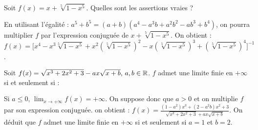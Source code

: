 \begin{question}

Soit  $f(x)=x+\sqrt[5]{1-x^5}$. Quelles sont les assertions vraies ?
\begin{answers}

    
    
    
\end{answers}
\begin{explanations}
En utilisant l'égalité : $a^5+b^5=(a+b)(a^4-a^3b+a^2b^2-ab^3+b^4)$, on pourra multiplier $f$ par l'expression conjuguée de $x+\sqrt[5]{1-x^5}$. On obtient :
 $f(x)=\big[x^4-x^3\sqrt[5]{1-x^5} +x^2(\sqrt[5]{1-x^5})^2-x(\sqrt[5]{1-x^5})^3+(\sqrt[5]{1-x^5})^4\big]^{-1}$.
\end{explanations}

\end{question}


\begin{question}

Soit  $f(x)=\sqrt{x^3+2x^2+3}-ax\sqrt{x+b}, \, a,b \in \mathbb{R}$. $f$ admet une limite  finie en $+\infty$  si et seulement si  :
\begin{answers}

    
    
    
    
\end{answers}
\begin{explanations}
Si $a\le 0$, $\lim_{x\to +\infty} f(x)=+\infty$. On suppose donc que $a>0$ et on multiplie $f$ par son expression conjuguée. on obtient : 
$f(x)= \frac{(1-a^2)x^3+(2-a^2b)x^2+3}{\sqrt{x^3+2x^2+3}+ax\sqrt{x+b}}$. On déduit que $f$ admet une limite finie en $+\infty$ si et seulement si $a=1$ et $b=2$.
\end{explanations}

\end{question}



